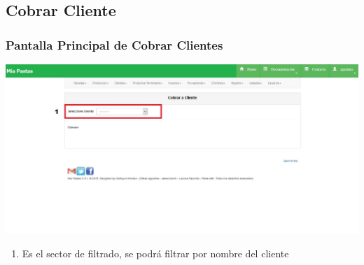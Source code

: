 \documentclass[letterpaper,10pt,english]{sphinxmanual}
\begin{document}
\subsection{{}Cobrar Cliente}
\label{cobrarCliente:cobrar-cliente}\label{cobrarCliente::doc}

\subsubsection{Pantalla Principal de Cobrar Clientes}
\label{cobrarCliente:pantalla-principal-de-cobrar-clientes}
\includegraphics{cobrar_ini.jpg}
\begin{enumerate}
\item {} 
Es el sector de filtrado, se podrá filtrar por nombre del cliente

\end{enumerate}
\end{document}
